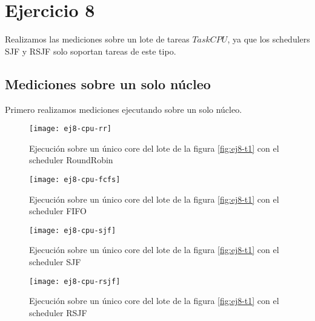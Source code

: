 \section{Ejercicio 8}

Realizamos las mediciones sobre un lote de tareas $TaskCPU$,
ya que los schedulers SJF y RSJF solo soportan tareas de este tipo.

\begin{center}
\end{center}
\label{fig:ej8-t1}
\vspace*{1em}

\subsection{Mediciones sobre un solo núcleo}

Primero realizamos mediciones ejecutando sobre un solo núcleo.

\begin{figure}[H]
        \centering
        \texttt{[image: ej8-cpu-rr]}
        \caption{Ejecución sobre un único core del lote de la figura
            \ref{fig:ej8-t1} con el scheduler RoundRobin}
        \label{fig:ej8-cpu-rr}
\end{figure}

\begin{figure}[H]
        \centering
        \texttt{[image: ej8-cpu-fcfs]}
        \caption{Ejecución sobre un único core del lote de la figura
            \ref{fig:ej8-t1} con el scheduler FIFO}
        \label{fig:ej8-cpu-fcfs}
\end{figure}

\begin{figure}[H]
        \centering
        \texttt{[image: ej8-cpu-sjf]}
        \caption{Ejecución sobre un único core del lote de la figura
            \ref{fig:ej8-t1} con el scheduler SJF}
        \label{fig:ej8-cpu-sjf}
\end{figure}

\begin{figure}[H]
        \centering
        \texttt{[image: ej8-cpu-rsjf]}
        \caption{Ejecución sobre un único core del lote de la figura
            \ref{fig:ej8-t1} con el scheduler RSJF}
        \label{fig:ej8-cpu-rsjf}
\end{figure}

